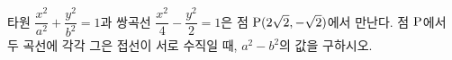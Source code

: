 타원 $\dfrac{x^2}{a^2}+\dfrac{y^2}{b^2}=1$과 쌍곡선 $\dfrac{x^2}{4}-\dfrac{y^2}{2}=1$은 점 $\mathrm{P}(2\sqrt{2}{,}\mkern3mu\mathopen{}-\sqrt{2})$에서 만난다. 점 $\mathrm{P}$에서 두 곡선에 각각 그은 접선이 서로 수직일 때, $a^2-b^2$의 값을 구하시오. 
